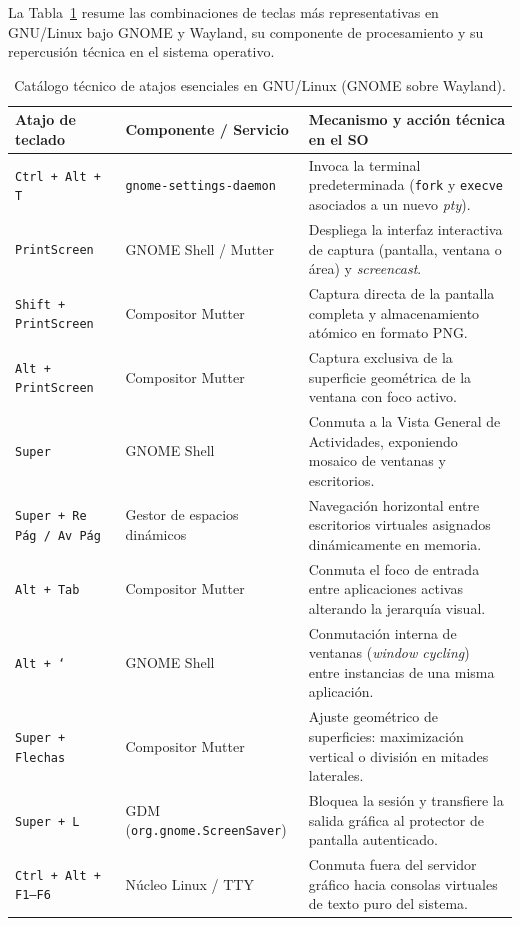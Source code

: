 \documentclass[12pt]{article}
\begin{document}
La Tabla~\ref{tab:catalogoAtajosGnome} resume las combinaciones de teclas más representativas en GNU/Linux bajo GNOME y Wayland, su componente de procesamiento y su repercusión técnica en el sistema operativo.

\begin{table}[htbp]
\centering
\footnotesize
\renewcommand{\arraystretch}{1.08}
\renewcommand{\tabularxcolumn}[1]{m{#1}}
\setlength{\emergencystretch}{1.5em}
\caption{Catálogo técnico de atajos esenciales en GNU/Linux (GNOME sobre Wayland).}
\label{tab:catalogoAtajosGnome}
\begin{tabularx}{\textwidth}{>{\centering\arraybackslash}m{2.8cm} X X}
\toprule
\textbf{Atajo de teclado} & \textbf{Componente / Servicio} & \textbf{Mecanismo y acción técnica en el SO} \\
\midrule
\texttt{Ctrl + Alt + T} & \texttt{gnome-settings-daemon} & Invoca la terminal predeterminada (\texttt{fork} y \texttt{execve} asociados a un nuevo \textit{pty}). \\
\addlinespace
\texttt{PrintScreen} & GNOME Shell / Mutter & Despliega la interfaz interactiva de captura (pantalla, ventana o área) y \textit{screencast}. \\
\addlinespace
\texttt{Shift + PrintScreen} & Compositor Mutter & Captura directa de la pantalla completa y almacenamiento atómico en formato PNG. \\
\addlinespace
\texttt{Alt + PrintScreen} & Compositor Mutter & Captura exclusiva de la superficie geométrica de la ventana con foco activo. \\
\addlinespace
\texttt{Super} & GNOME Shell & Conmuta a la Vista General de Actividades, exponiendo mosaico de ventanas y escritorios. \\
\addlinespace
\texttt{Super + Re Pág / Av Pág} & Gestor de espacios dinámicos & Navegación horizontal entre escritorios virtuales asignados dinámicamente en memoria. \\
\addlinespace
\texttt{Alt + Tab} & Compositor Mutter & Conmuta el foco de entrada entre aplicaciones activas alterando la jerarquía visual. \\
\addlinespace
\texttt{Alt + `} & GNOME Shell & Conmutación interna de ventanas (\textit{window cycling}) entre instancias de una misma aplicación. \\
\addlinespace
\texttt{Super + Flechas} & Compositor Mutter & Ajuste geométrico de superficies: maximización vertical o división en mitades laterales. \\
\addlinespace
\texttt{Super + L} & GDM (\texttt{org.gnome.ScreenSaver}) & Bloquea la sesión y transfiere la salida gráfica al protector de pantalla autenticado. \\
\addlinespace
\texttt{Ctrl + Alt + F1--F6} & Núcleo Linux / TTY & Conmuta fuera del servidor gráfico hacia consolas virtuales de texto puro del sistema. \\
\bottomrule
\end{tabularx}
\end{table}
\end{document}
